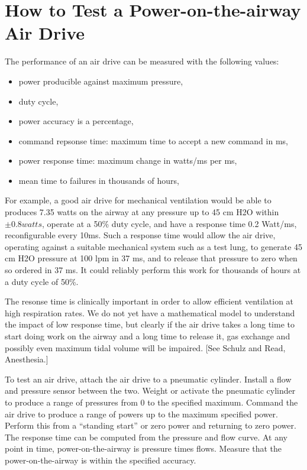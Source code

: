 \documentclass[conference]{article}
\begin{document}
\section{How to Test a  Power-on-the-airway Air Drive}

The performance of an air drive can be measured with the following values:
\begin{itemize}
\item{power producible against maximum pressure,}
\item{duty cycle,}
\item{power accuracy is a percentage,}
\item{command repsonse time: maximum time to accept a new command in ms,}
\item{power response time: maximum change in watts/ms per ms,}
\item{mean time to failures in thousands of hours,}
\end{itemize}


For example, a good air drive for mechanical ventilation would be
able to produces 7.35 watts on the airway at any pressure up to 45 cm H2O within
$\pm 0.8 watts$, operate at a
50\% duty cycle, and have a response time 0.2 Watt/ms, reconfigurable every 10ms.
Such a response time
would allow the air drive, operating against a suitable mechanical system such
as a test lung, to generate 45 cm H2O pressure at 100 lpm in 37 ms, and
to release that pressure to zero when so ordered in 37 ms.
It could reliably perform this work for thousands of hours at a duty cycle of 50\%.

The resonse time is clinically important in order to allow efficient ventilation
at high respiration rates.
We do not yet have a mathematical model to understand the impact of low response time,
but clearly if the air drive takes a long time to start doing work on the airway
and a long time to release it, gas exchange and possibly even maximum tidal volume
will be impaired. [See Schulz and Read, Anesthesia.]

To test an air drive, attach the air drive to a pneumatic cylinder. Install a flow
and pressure sensor between the two. Weight or activate the pneumatic cylinder
to produce a range of pressures from 0 to the specified maximum. Command the air drive
to produce a range of powers up to the maximum specified power. Perform this
from a ``standing start'' or zero power and returning to zero power. The response time
can be computed from the pressure and flow curve. At any point in time, power-on-the-airway
is pressure times flows. Measure that the power-on-the-airway is within the specified
accuracy.
\end{document}
